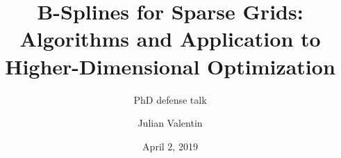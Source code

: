 \title[B-Splines for Sparse Grids]{%
  B-Splines for Sparse Grids:
  Algorithms and Application to Higher-Dimensional Optimization%
}
\subtitle{PhD defense talk}
\author{Julian Valentin}
\date{April 2, 2019}

